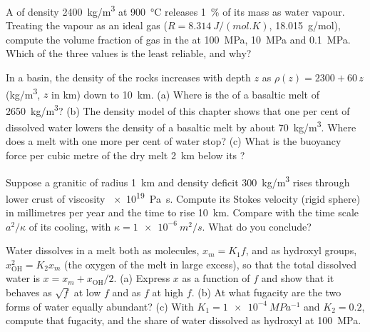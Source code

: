 \begin{exercise}[$\star\star$]\label{exo:b2:magma-emplacement:7}
A  of density \qty{2400}{kg/m^3} at \qty{900}{\celsius} releases
\qty{1}{\percent} of its mass as water vapour. Treating the vapour as an ideal gas
($R = \qty{8.314}{J/(mol.K)}$, \qty{18.015}{g/mol}), compute the volume fraction of
gas in the  at \qty{100}{MPa}, \qty{10}{MPa} and \qty{0.1}{MPa}. Which of the
three values is the least reliable, and why?
\end{exercise}

\begin{exercise}[$\star\star$]\label{exo:b2:magma-emplacement:8}
In a basin, the density of the rocks increases with depth $z$ as $\rho(z) =
2300 + 60\,z$ (\unit{kg/m^3}, $z$ in \unit{km}) down to \qty{10}{km}. (a) Where is
the  of a basaltic melt of \qty{2650}{kg/m^3}? (b) The
density model of this chapter shows that one per cent of dissolved water lowers
the density of a basaltic melt by about \qty{70}{kg/m^3}. Where does a melt with
one more per cent of water stop? (c) What is the buoyancy force per cubic metre
of the dry melt \qty{2}{km} below its ?
\end{exercise}

\begin{exercise}[$\star\star$]\label{exo:b2:magma-emplacement:9}
Suppose a granitic  of radius \qty{1}{km} and density deficit
\qty{300}{kg/m^3} rises through lower crust of viscosity \qty{e19}{Pa.s}. Compute
its Stokes velocity (rigid sphere) in millimetres per year and the time to rise
\qty{10}{km}. Compare with the time scale $a^2/\kappa$ of its cooling, with $\kappa
= \qty{1e-6}{m^2/s}$. What do you conclude?
\end{exercise}

\begin{exercise}[$\star\star\star$]\label{exo:b2:magma-emplacement:10}
Water dissolves in a melt both as molecules, $x_m = K_1 f$, and as hydroxyl
groups, $x_{\mathrm{OH}}^2 = K_2 x_m$ (the oxygen of the melt in large excess), so
that the total dissolved water is $x = x_m + x_{\mathrm{OH}}/2$. (a) Express $x$ as a
function of $f$ and show that it behaves as $\sqrt f$ at low $f$ and as $f$ at
high $f$. (b) At what fugacity are the two forms of water equally abundant? (c)
With $K_1 = \qty{1e-4}{MPa^{-1}}$ and $K_2 = 0.2$, compute that fugacity, and the
share of water dissolved as hydroxyl at \qty{100}{MPa}.
\end{exercise}

